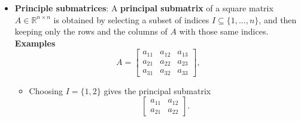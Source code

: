 \documentclass{report}
\begin{document}
\begin{itemize}
        
        \item \textbf{Principle submatrices}: 
            A \textbf{principal submatrix} of a square matrix 
            $A \in \mathbb{R}^{n \times n}$ is obtained by selecting a subset of indices 
            $I \subseteq \{1, \ldots, n\}$, and then keeping only the rows and the columns of $A$ with those same indices.
            \bigbreak \noindent 
            \textbf{Examples}
            \[
                A =
                \begin{bmatrix}
                    a_{11} & a_{12} & a_{13} \\
                    a_{21} & a_{22} & a_{23} \\
                    a_{31} & a_{32} & a_{33}
                \end{bmatrix},
            \]
            \begin{itemize}
                \item Choosing $I = \{1,2\}$ gives the principal submatrix
                    \[
                        \begin{bmatrix}
                            a_{11} & a_{12} \\
                            a_{21} & a_{22}
                        \end{bmatrix}.
                    \]


\end{itemize}
\end{itemize}
\end{document}
